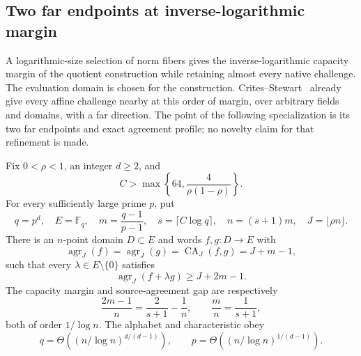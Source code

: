 \subsection{Two far endpoints at inverse-logarithmic margin}
\label{subsec:random-norm-tags}

A logarithmic-size selection of norm fibers gives the inverse-logarithmic
capacity margin of the quotient construction while retaining almost every
native challenge.  The evaluation domain is chosen for the construction.
Crites--Stewart~\cite[Corollary~1]{crites-stewart2025} already give
every affine challenge nearby at this order of margin, over arbitrary
fields and domains, with a far direction. The point of the following
specialization is its two far endpoints and exact agreement profile;
no novelty claim for that refinement is made.



\begin{theorem}\label{thm:random-norm-tag-log-gap}
Fix $0<\rho<1$, an integer $d\ge2$, and
\[
 C>\max\left\{64,\frac4{\rho(1-\rho)}\right\}.
\]
For every sufficiently large prime $p$, put
\[
 q=p^d,\quad E=\mathbb F_q,\quad
 m=\frac{q-1}{p-1},\quad s=\lceil C\log q\rceil,\quad
 n=(s+1)m,\quad J=\lfloor\rho n\rfloor.
\]
There is an $n$-point domain $D\subset E$ and words $f,g:D\to E$ with
\[
 \operatorname{agr}_J(f)=\operatorname{agr}_J(g)
 =\operatorname{CA}_J(f,g)=J+m-1,
\]
such that every $\lambda\in E\setminus\{0\}$ satisfies
\[
 \operatorname{agr}_J(f+\lambda g)\ge J+2m-1.
\]
The capacity margin and source-agreement gap are respectively
\[
 \frac{2m-1}{n}=\frac2{s+1}-\frac1n,
 \qquad \frac mn=\frac1{s+1},
\]
both of order $1/\log n$.  The alphabet and characteristic obey
\[
 q=\Theta\!\left((n/\log n)^{d/(d-1)}\right),\qquad
 p=\Theta\!\left((n/\log n)^{1/(d-1)}\right).
\]
\end{theorem}

